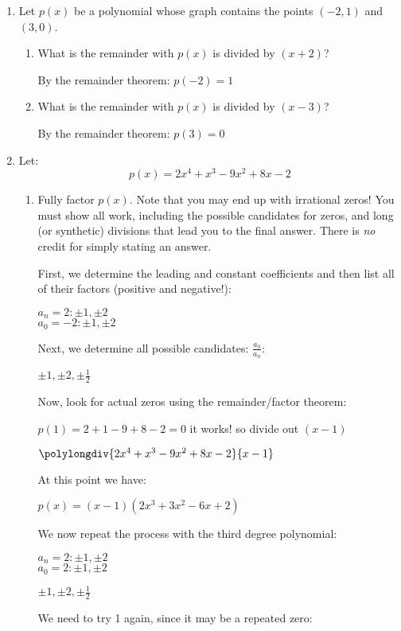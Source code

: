 \documentclass[letterpaper,12pt,fleqn]{article}
\begin{document}
\begin{enumerate}

\item Let $p(x)$ be a polynomial whose graph contains the points $(-2,1)$ and
  $(3,0)$.
  \begin{enumerate}
  \item What is the remainder with $p(x)$ is divided by $(x+2)$?

    By the remainder theorem: $p(-2)=1$
    
  \item What is the remainder with $p(x)$ is divided by $(x-3)$?

    By the remainder theorem: $p(3)=0$
  \end{enumerate}

\item Let:
  \[p(x)=2x^4+x^3-9x^2+8x-2\]
  \begin{enumerate}
  \item Fully factor $p(x)$. Note that you may end up with irrational zeros!
    You must show all work, including the possible candidates for zeros, and
    long (or synthetic) divisions that lead you to the final answer.  There is
    \emph{no} credit for simply stating an answer.

    First, we determine the leading and constant coefficients and then list
    all of their factors (positive and negative!):

    $a_n=2: \pm1,\pm2$ \\
    $a_0=-2:  \pm1,\pm2$

    Next, we determine all possible candidates: $\frac{a_0}{a_n}$:

    $\pm1,\pm2,\pm\frac{1}{2}$

    Now, look for actual zeros using the remainder/factor theorem:

    $p(1)=2+1-9+8-2=0$ it works! so divide out $(x-1)$

    $\polylongdiv{2x^4+x^3-9x^2+8x-2}{x-1}$

    At this point we have:

    $p(x)=(x-1)(2x^3+3x^2-6x+2)$

    We now repeat the process with the third degree polynomial:

    $a_n=2: \pm1,\pm2$ \\
    $a_0=2:  \pm1,\pm2$

    $\pm1,\pm2,\pm\frac{1}{2}$

    We need to try 1 again, since it may be a repeated zero:


\end{enumerate}
\end{enumerate}
\end{document}
